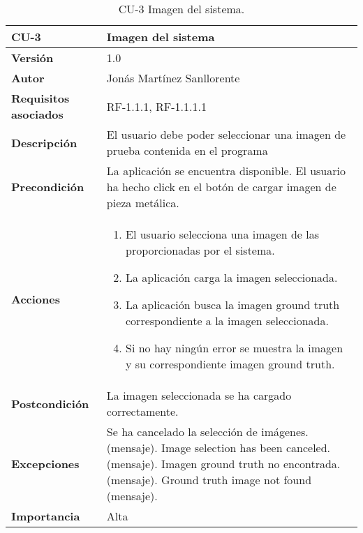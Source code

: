 \begin{table}[p]
	\centering
	\begin{tabularx}{\linewidth}{ p{} p{} }
		\toprule
		\textbf{CU-3}    & \textbf{Imagen del sistema}\\
		\toprule
		\textbf{Versión}              & 1.0    \\
		\textbf{Autor}                & Jonás Martínez Sanllorente \\
		\textbf{Requisitos asociados} & RF-1.1.1, RF-1.1.1.1 \\
		\textbf{Descripción}          & El usuario debe poder seleccionar una imagen de prueba contenida en el programa \\
		\textbf{Precondición}         & La aplicación se encuentra disponible.\newline
                                        El usuario ha hecho click en el botón de cargar imagen de pieza metálica.\\
		\textbf{Acciones}             &
		\begin{enumerate}
			\def\labelenumi{\arabic{enumi}.}
			\tightlist
			\item El usuario selecciona una imagen de las proporcionadas por el sistema.
			\item La aplicación carga la imagen seleccionada.
            \item La aplicación busca la imagen ground truth correspondiente a la imagen seleccionada.
            \item Si no hay ningún error se muestra la imagen y su correspondiente imagen ground truth.
		\end{enumerate}\\
		\textbf{Postcondición}        & La imagen seleccionada se ha cargado correctamente. \\
		\textbf{Excepciones}          & Se ha cancelado la selección de imágenes. (mensaje).\newline
                                        Image selection has been canceled. (mensaje).\newline
                                        Imagen ground truth no encontrada. (mensaje).\newline
                                        Ground truth image not found (mensaje). \\
		\textbf{Importancia}          & Alta \\
		\bottomrule
	\end{tabularx}
	\caption{CU-3 Imagen del sistema.}
\end{table}

